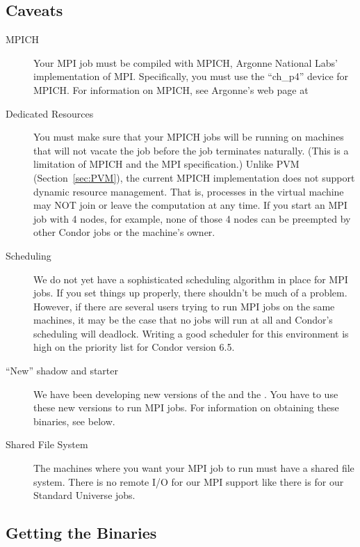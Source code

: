 \subsection{\label{sec:MPI-caveats}Caveats}
\begin{description}
\item[MPICH] Your MPI job must be compiled with MPICH, Argonne National
Labs' implementation of MPI.  Specifically, you must use the ``ch\_p4'' 
device for MPICH.  For information on MPICH, see Argonne's web page
at 

\item[Dedicated Resources] You must make sure that your MPICH jobs
will be running on machines that will not vacate the job before the job
terminates naturally.  (This is a limitation of MPICH and the MPI 
specification.) Unlike PVM (Section~\ref{sec:PVM}), the current MPICH
implementation does not support dynamic resource management.  That is, 
processes in the virtual machine may NOT join or leave the computation at 
any time.  If you start an MPI job with 4 nodes, for example, none of those 4 
nodes can be preempted by other Condor jobs or the machine's owner.

\item[Scheduling] We do not yet have a sophisticated scheduling 
algorithm in place for MPI jobs.  If you set things up properly, 
there shouldn't be much of a problem.  However, if there are several
users trying to run MPI jobs on the same machines, it may be the case 
that no jobs will run at all and Condor's scheduling will deadlock.  
Writing a good scheduler for this environment is high on the priority 
list for Condor version 6.5.

\item[``New'' shadow and starter] We have been developing new versions
of the  and the .  You have to use these
new versions to run MPI jobs.  For information on obtaining these 
binaries, see below.

\item[Shared File System] The machines where you want your MPI job
to run must have a shared file system.  There is no remote I/O for
our MPI support like there is for our Standard Universe jobs.
\end{description}


\subsection{\label{sec:MPI-binaries}Getting the Binaries}


